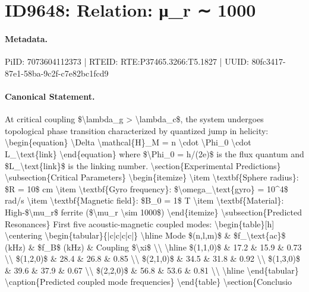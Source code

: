 \section*{ID9648: Relation: μ\_r ∼ 1000}
\paragraph{Metadata.}
PiID: 7073604112373 | RTEID: RTE:P37465.3266:T5.1827 | UUID: 80fc3417-87e1-58ba-9c2f-c7e82bc1fcd9

\paragraph{Canonical Statement.}
At critical coupling \$\textbackslash{}lambda\_g > \textbackslash{}lambda\_c\$, the system undergoes topological phase transition characterized by quantized jump in helicity: \textbackslash{}begin\{equation\} \textbackslash{}Delta \textbackslash{}mathcal\{H\}\_M = n \textbackslash{}cdot \textbackslash{}Phi\_0 \textbackslash{}cdot L\_\textbackslash{}text\{link\} \textbackslash{}end\{equation\} where \$\textbackslash{}Phi\_0 = h/(2e)\$ is the flux quantum and \$L\_\textbackslash{}text\{link\}\$ is the linking number. \textbackslash{}section\{Experimental Predictions\} \textbackslash{}subsection\{Critical Parameters\} \textbackslash{}begin\{itemize\} \textbackslash{}item \textbackslash{}textbf\{Sphere radius\}: \$R = 10\$ cm \textbackslash{}item \textbackslash{}textbf\{Gyro frequency\}: \$\textbackslash{}omega\_\textbackslash{}text\{gyro\} = 10\textasciicircum{}4\$ rad/s \textbackslash{}item \textbackslash{}textbf\{Magnetic field\}: \$B\_0 = 1\$ T \textbackslash{}item \textbackslash{}textbf\{Material\}: High-\$\textbackslash{}mu\_r\$ ferrite (\$\textbackslash{}mu\_r \textbackslash{}sim 1000\$) \textbackslash{}end\{itemize\} \textbackslash{}subsection\{Predicted Resonances\} First five acoustic-magnetic coupled modes: \textbackslash{}begin\{table\}[h] \textbackslash{}centering \textbackslash{}begin\{tabular\}\{|c|c|c|c|\} \textbackslash{}hline Mode \$(n,l,m)\$ \& \$f\_\textbackslash{}text\{ac\}\$ (kHz) \& \$f\_B\$ (kHz) \& Coupling \$\textbackslash{}xi\$ \textbackslash{}\textbackslash{} \textbackslash{}hline \$(1,1,0)\$ \& 17.2 \& 15.9 \& 0.73 \textbackslash{}\textbackslash{} \$(1,2,0)\$ \& 28.4 \& 26.8 \& 0.85 \textbackslash{}\textbackslash{} \$(2,1,0)\$ \& 34.5 \& 31.8 \& 0.92 \textbackslash{}\textbackslash{} \$(1,3,0)\$ \& 39.6 \& 37.9 \& 0.67 \textbackslash{}\textbackslash{} \$(2,2,0)\$ \& 56.8 \& 53.6 \& 0.81 \textbackslash{}\textbackslash{} \textbackslash{}hline \textbackslash{}end\{tabular\} \textbackslash{}caption\{Predicted coupled mode frequencies\} \textbackslash{}end\{table\} \textbackslash{}section\{Conclusio

